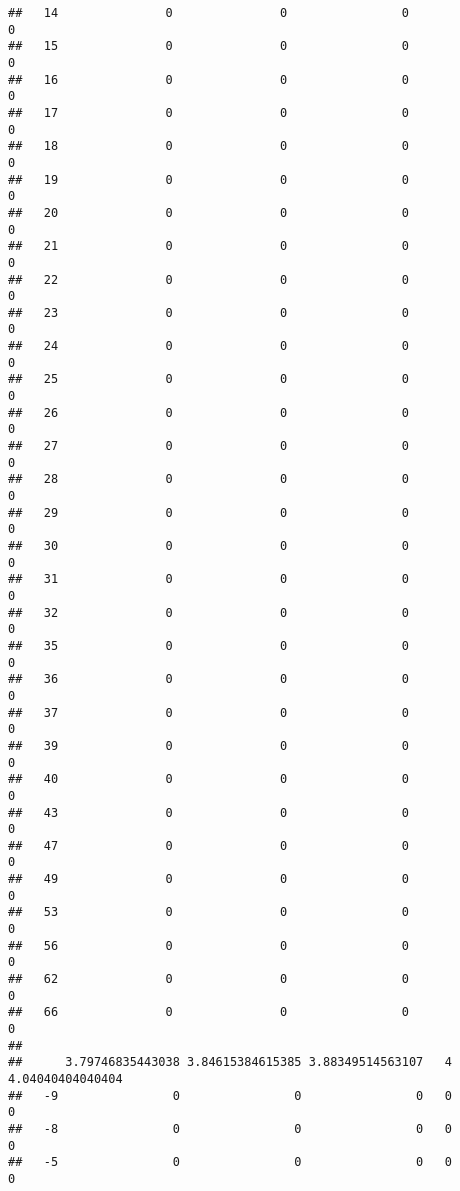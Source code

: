 \documentclass[]{article}
\begin{document}
\begin{verbatim}
##   14               0               0                0                0
##   15               0               0                0                0
##   16               0               0                0                0
##   17               0               0                0                0
##   18               0               0                0                0
##   19               0               0                0                0
##   20               0               0                0                0
##   21               0               0                0                0
##   22               0               0                0                0
##   23               0               0                0                0
##   24               0               0                0                0
##   25               0               0                0                0
##   26               0               0                0                0
##   27               0               0                0                0
##   28               0               0                0                0
##   29               0               0                0                0
##   30               0               0                0                0
##   31               0               0                0                0
##   32               0               0                0                0
##   35               0               0                0                0
##   36               0               0                0                0
##   37               0               0                0                0
##   39               0               0                0                0
##   40               0               0                0                0
##   43               0               0                0                0
##   47               0               0                0                0
##   49               0               0                0                0
##   53               0               0                0                0
##   56               0               0                0                0
##   62               0               0                0                0
##   66               0               0                0                0
##     
##      3.79746835443038 3.84615384615385 3.88349514563107   4 4.04040404040404
##   -9                0                0                0   0                0
##   -8                0                0                0   0                0
##   -5                0                0                0   0                0

\end{verbatim}
\end{document}
